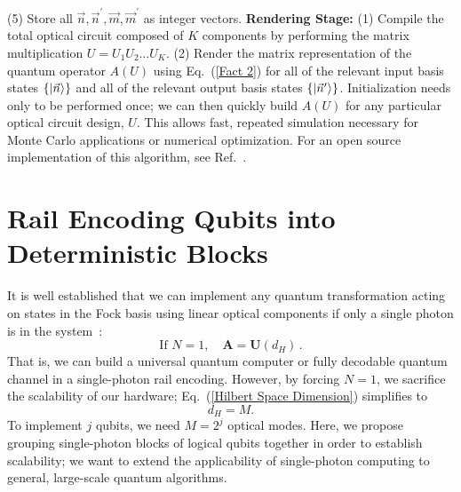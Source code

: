 \documentclass[aps,pra,twocolumn,superscriptaddress,floatfix,10pt]{revtex4}
\begin{document}
		\newline
		\newline
		(5) Store all $\vec{n}, \vec{n}^\prime, \vec{m}, \vec{m}^\prime$ as integer vectors.
		\newline
		\newline
\textbf{Rendering Stage:}
\newline
\newline
		(1)  Compile the total optical circuit composed of $K$ components by performing the matrix multiplication $ U = U_1 U_2 \dots U_K $.
		\newline
		\newline
		(2) Render the matrix representation of the quantum operator $A(U)$ using Eq.~(\ref{Fact 2}) for all of the relevant input basis states $\{\ket{\vec{n}}\}$ and all of the relevant output basis states $\{\ket{\vec{n}^\prime}\}$.
\newline
\newline \indent
 Initialization needs only to be performed once; we can then quickly build $A(U)$ for any particular optical circuit design, $U$. This allows fast, repeated simulation necessary for Monte Carlo applications or numerical optimization. For an open source implementation of this algorithm, see Ref.~\cite{GitHub}.
\section{Rail Encoding Qubits into Deterministic Blocks}
\label{Section Block Encoding}
It is well established that we can implement any quantum transformation acting on states in the Fock basis using linear optical components if only a single photon is in the system~\cite{Adami,Torma,Pittman}:
\begin{equation}
\label{Isomorphism}
	\mbox{If } N=1, \quad \textbf{A} = \textbf{U}(d_H)\,.
\end{equation}
That is, we can build a universal quantum computer or fully decodable quantum channel in a single-photon rail encoding. However, by forcing $N=1$, we sacrifice the scalability of our hardware; Eq.~(\ref{Hilbert Space Dimension}) simplifies to
\begin{equation}
d_H = M.
\end{equation}
To implement $j$ qubits, we need $M=2^j$ optical modes. Here, we propose grouping single-photon blocks of logical qubits together in order to establish scalability; we want to extend the applicability of single-photon computing to general, large-scale quantum algorithms. 
\end{document}
